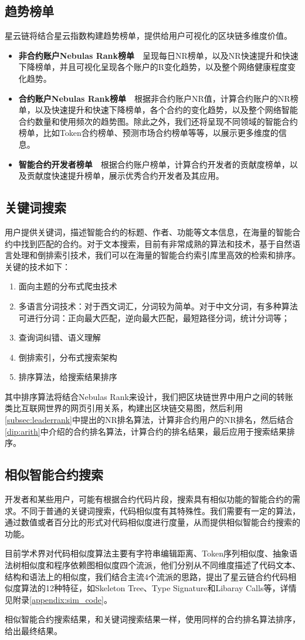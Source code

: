 \subsection{趋势榜单}
星云链将结合星云指数构建趋势榜单，提供给用户可视化的区块链多维度价值。
\begin{itemize}
\item \textbf{非合约账户Nebulas Rank榜单}~~呈现每日NR榜单，以及NR快速提升和快速下降榜单，并且可视化呈现各个账户的R变化趋势，以及整个网络健康程度变化趋势。
\item \textbf{合约账户Nebulas Rank榜单}~~根据非合约账户NR值，计算合约账户的NR榜单，以及快速提升和快速下降榜单，各个合约的变化趋势，以及整个网络智能合约数量和使用频次的趋势图。除此之外，我们还将呈现不同领域的智能合约榜单，比如Token合约榜单、预测市场合约榜单等等，以展示更多维度的信息。
\item \textbf{智能合约开发者榜单}~~根据合约账户榜单，计算合约开发者的贡献度榜单，以及贡献度快速提升榜单，展示优秀合约开发者及其应用。
\end{itemize}

\subsection{关键词搜索}
用户提供关键词，描述智能合约的标题、作者、功能等文本信息，在海量的智能合约中找到匹配的合约。对于文本搜索，目前有非常成熟的算法和技术，基于自然语言处理和倒排索引技术，我们可以在海量的智能合约索引库里高效的检索和排序。关键的技术如下：

\begin{enumerate}
	\item 面向主题的分布式爬虫技术
	\item 多语言分词技术：对于西文词汇，分词较为简单。对于中文分词，有多种算法可进行分词：正向最大匹配，逆向最大匹配，最短路径分词，统计分词等；
	\item 查询词纠错、语义理解
	\item 倒排索引，分布式搜索架构
	\item 排序算法，给搜索结果排序
\end{enumerate}

其中排序算法将结合Nebulas Rank来设计，我们把区块链世界中用户之间的转账类比互联网世界的网页引用关系，构建出区块链交易图，然后利用\ref{subsec:leaderrank}中提出的NR排名算法，计算非合约用户的NR排名，然后结合\ref{dip:arith}中介绍的合约排名算法，计算合约的排名结果，最后应用于搜索结果排序。


\subsection{相似智能合约搜索}
开发者和某些用户，可能有根据合约代码片段，搜索具有相似功能的智能合约的需求。不同于普通的关键词搜索，代码相似度有其特殊性。我们需要有一定的算法，通过数值或者百分比的形式对代码相似度进行度量，从而提供相似智能合约搜索的功能。

目前学术界对代码相似度算法主要有字符串编辑距离、Token序列相似度、抽象语法树相似度和程序依赖图相似度四个流派，他们分别从不同维度描述了代码文本、结构和语法上的相似度，我们结合主流4个流派的思路，提出了星云链合约代码相似度算法的12种特征，如Skeleton Tree、Type Signature和Libaray Calls等，详情见附录\ref{appendix:sim_code}。

相似智能合约搜索结果，和关键词搜索结果一样，使用同样的合约排名算法排序，给出最终结果。
